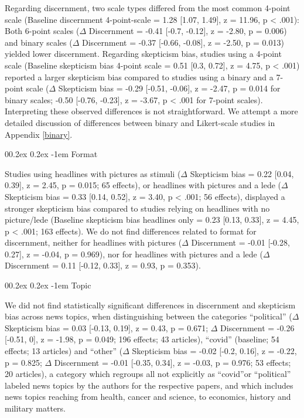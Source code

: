 \documentclass[
  man]{apa6}
\makeatletter
\let\oldparagraph\paragraph
\renewcommand{\paragraph}{
    \@ifstar
      \xxxParagraphStar
      \xxxParagraphNoStar
  }
\newcommand{\xxxParagraphStar}[1]{\oldparagraph*{#1}\mbox{}}
\newcommand{\xxxParagraphNoStar}[1]{\oldparagraph{#1}\mbox{}}
\renewcommand{\paragraph}{\@startsection{paragraph}{4}{\parindent}%
  {0\baselineskip \@plus 0.2ex \@minus 0.2ex}%
  {-1em}%
  {\normalfont\normalsize\bfseries\itshape\typesectitle}}
\makeatother
\begin{document}
Regarding discernment, two scale types differed from the most common 4-point scale (Baseline discernment 4-point-scale = 1.28 {[}1.07, 1.49{]}, z = 11.96, p \textless{} .001): Both 6-point scales (\(\Delta\) Discernment = -0.41 {[}-0.7, -0.12{]}, z = -2.80, p = 0.006) and binary scales (\(\Delta\) Discernment = -0.37 {[}-0.66, -0.08{]}, z = -2.50, p = 0.013) yielded lower discernment. Regarding skepticism bias, studies using a 4-point scale (Baseline skepticism bias 4-point scale = 0.51 {[}0.3, 0.72{]}, z = 4.75, p \textless{} .001) reported a larger skepticism bias compared to studies using a binary and a 7-point scale (\(\Delta\) Skepticism bias = -0.29 {[}-0.51, -0.06{]}, z = -2.47, p = 0.014 for binary scales; -0.50 {[}-0.76, -0.23{]}, z = -3.67, p \textless{} .001 for 7-point scales). Interpreting these observed differences is not straightforward. We attempt a more detailed discussion of differences between binary and Likert-scale studies in Appendix \ref{binary}.

\paragraph{Format}\label{format}

Studies using headlines with pictures as stimuli (\(\Delta\) Skepticism bias = 0.22 {[}0.04, 0.39{]}, z = 2.45, p = 0.015; 65 effects), or headlines with pictures and a lede (\(\Delta\) Skepticism bias = 0.33 {[}0.14, 0.52{]}, z = 3.40, p \textless{} .001; 56 effects), displayed a stronger skepticism bias compared to studies relying on headlines with no picture/lede (Baseline skepticism bias headlines only = 0.23 {[}0.13, 0.33{]}, z = 4.45, p \textless{} .001; 163 effects). We do not find differences related to format for discernment, neither for headlines with pictures (\(\Delta\) Discernment = -0.01 {[}-0.28, 0.27{]}, z = -0.04, p = 0.969), nor for headlines with pictures and a lede (\(\Delta\) Discernment = 0.11 {[}-0.12, 0.33{]}, z = 0.93, p = 0.353).

\paragraph{Topic}\label{topic}

We did not find statistically significant differences in discernment and skepticism bias across news topics, when distinguishing between the categories ``political'' (\(\Delta\) Skepticism bias = 0.03 {[}-0.13, 0.19{]}, z = 0.43, p = 0.671; \(\Delta\) Discernment = -0.26 {[}-0.51, 0{]}, z = -1.98, p = 0.049; 196 effects; 43 articles), ``covid'' (baseline; 54 effects; 13 articles) and ``other'' (\(\Delta\) Skepticism bias = -0.02 {[}-0.2, 0.16{]}, z = -0.22, p = 0.825; \(\Delta\) Discernment = -0.01 {[}-0.35, 0.34{]}, z = -0.03, p = 0.976; 53 effects; 20 articles), a category which regroups all not explicitly as ``covid''or ``political'' labeled news topics by the authors for the respective papers, and which includes news topics reaching from health, cancer and science, to economics, history and military matters.
\end{document}
